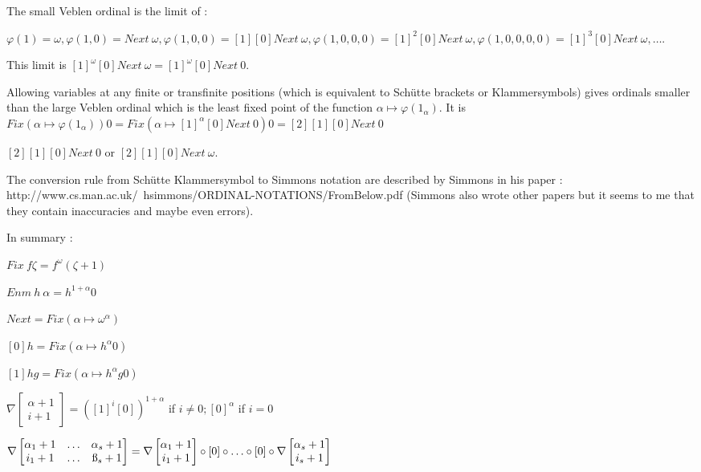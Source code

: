 \documentclass[10pt]{article}
\begin{document}
\bigskip

The small Veblen ordinal is the limit of :

 \( \varphi(1) = \omega, \varphi(1,0) = Next\ \omega, \varphi(1,0,0) = [1] [0] Next\ \omega, \varphi(1,0,0,0) = [1]^2 [0] Next\ \omega, \varphi(1,0,0,0,0) = [1]^3 [0] Next\ \omega, \ldots \). 

This limit is \( [1]^\omega [0] Next\ \omega = [1]^\omega [0] Next\ 0 \).

\bigskip

Allowing variables at any finite or transfinite positions (which is equivalent to Schütte brackets or Klammersymbols) gives ordinals smaller than the large Veblen ordinal which is the least fixed point of the function \( \alpha \mapsto \varphi(1_\alpha) \). It is \( Fix (\alpha \mapsto \varphi(1_\alpha)) 0 = Fix (\alpha \mapsto [1]^\alpha [0] Next\ 0) 0 = [2] [1] [0] Next\ 0 \)


\( [2] [1] [0] Next\ 0 \) or \( [2] [1] [0] Next\ \omega \). 

The conversion rule from Schütte Klammersymbol to Simmons notation are described by Simmons in his paper : http://www.cs.man.ac.uk/~hsimmons/ORDINAL-NOTATIONS/FromBelow.pdf (Simmons also wrote other papers but it seems to me that they contain inaccuracies and maybe even errors).

In summary :

\( Fix\ f \zeta = f^\omega (\zeta+1) \)

\( Enm\ h\ \alpha = h^{1+\alpha} 0 \)

\( Next = Fix (\alpha \mapsto \omega^\alpha) \)

\( [0] h = Fix (\alpha \mapsto h^\alpha 0) \)

\( [1] h g = Fix (\alpha \mapsto h^\alpha g 0) \)

\( \nabla \begin{bmatrix} \alpha+1 \\
                                    i+1      \end{bmatrix} =
 ([1]^i [0])^{1+\alpha} \) if \( i \neq 0 ; [0]^\alpha \) if \( i = 0 \)

\( \nabla \begin{bmatrix} \alpha_1+1 & \ldots & \alpha_s+1 \\
                                    i_1+1      & \ldots & \i_s+1     \end{bmatrix} 
= \nabla \begin{bmatrix} \alpha_1+1 \\
                                   i_1+1      \end{bmatrix} \circ [0] \circ \ldots \circ [0] \circ \nabla \begin{bmatrix} \alpha_s+1 \\
                                                                                                                    i_s+1      \end{bmatrix}
\)
\end{document}
